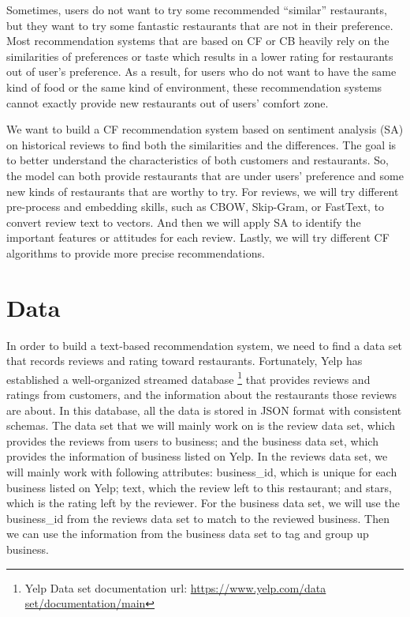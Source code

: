 \documentclass[11pt]{article}
\begin{document}
Sometimes, users do not want to try some recommended “similar” restaurants, but they want to try some fantastic restaurants that are not in their preference. Most recommendation systems that are based on CF or CB heavily rely on the similarities of preferences or taste which results in a lower rating for restaurants out of user’s preference. As a result, for users who do not want to have the same kind of food or the same kind of environment, these recommendation systems cannot exactly provide new restaurants out of users’ comfort zone.

We want to build a CF recommendation system based on sentiment analysis (SA) on historical reviews to find both the similarities and the differences. The goal is to better understand the characteristics of both customers and restaurants. So, the model can both provide restaurants that are under users’ preference and some new kinds of restaurants that are worthy to try. For reviews, we will try different pre-process and embedding skills, such as CBOW, Skip-Gram, or FastText, to convert review text to vectors. And then we will apply SA to identify the important features or attitudes for each review. Lastly, we will try different CF algorithms to provide more precise recommendations. 

\section{Data}

In order to build a text-based recommendation system, we need to find a data set that records reviews and rating toward restaurants. Fortunately, Yelp has established a well-organized streamed database \footnote{Yelp Data set documentation url: \url{https://www.yelp.com/data set/documentation/main}} that provides reviews and ratings from customers, and the information about the restaurants those reviews are about. In this database, all the data is stored in JSON format with consistent schemas. The data set that we will mainly work on is the review data set, which provides the reviews from users to business; and the business data set, which provides the information of business listed on Yelp. In the reviews data set, we will mainly work with following attributes: business\_id, which is unique for each business listed on Yelp; text, which the review left to this restaurant; and stars, which is the rating left by the reviewer. For the business data set, we will use the business\_id from the reviews data set to match to the reviewed business. Then we can use the information from the business data set to tag and group up business. 
\end{document}
